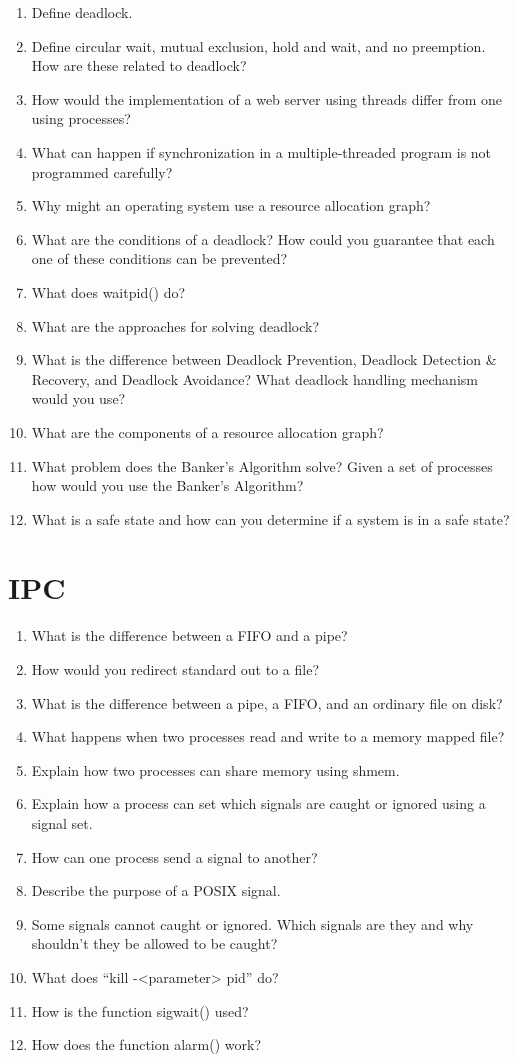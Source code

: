\documentclass[11pt]{article}
\begin{document}
\begin{enumerate}
\item Define deadlock.
\item Define circular wait, mutual exclusion, hold and wait, and no
      preemption. How are these related to deadlock?
\item How would the implementation of a web server using threads differ from one using processes?
\item What can happen if synchronization in a multiple-threaded program is not programmed carefully?
\item Why might an operating system use a resource allocation graph?
\item What are the conditions of a deadlock? How could you guarantee that each one of these conditions can be prevented?
\item What does waitpid() do?
\item What are the approaches for solving deadlock?
\item What is the difference between Deadlock Prevention, Deadlock
      Detection \& Recovery, and Deadlock Avoidance? What deadlock handling mechanism would you use?
\item What are the components of a resource allocation graph?
\item What problem does the Banker’s Algorithm solve? Given a set of
     processes how would you use the Banker’s Algorithm?
\item What is a safe state and how can you determine if a system is in a
     safe state?
\end{enumerate}
\section{IPC}
\label{sec-15}

\begin{enumerate}
\item What is the difference between a FIFO and a pipe?
\item How would you redirect standard out to a file?
\item What is the difference between a pipe, a FIFO, and an ordinary file on disk?
\item What happens when two processes read and write to a memory
      mapped file?
\item Explain how two processes can share memory using shmem.
\item Explain how a process can set which signals are caught or
      ignored using a signal set.
\item How can one process send a signal to another?
\item Describe the purpose of a POSIX signal.
\item Some signals cannot caught or ignored. Which signals are they and
      why shouldn’t they be allowed to be caught?
\item What does “kill -<parameter> pid” do?
\item How is the function sigwait() used?
\item How does the function alarm() work?
\end{enumerate}
\end{document}
